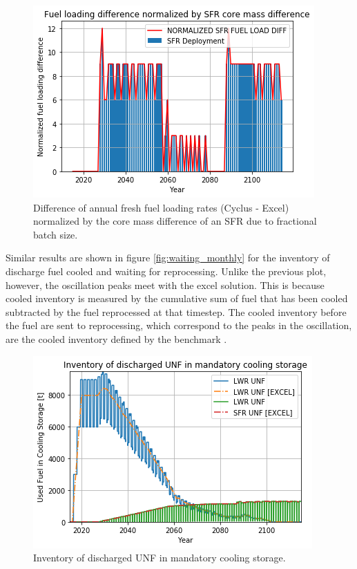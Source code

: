 \begin{figure}[htbp!]
    \begin{center}
        \includegraphics[scale=0.5]{./images/results_18/fuel_load_diff_norm.png}
    \end{center}
        \caption{Difference of annual fresh fuel loading rates (Cyclus - Excel) normalized by the core mass difference of an \gls{SFR} due to fractional batch size.}
    \label{fig:fuel_load_diff_norm}
\end{figure}


Similar results are shown in figure \ref{fig:waiting_monthly} for the inventory of discharge fuel cooled and waiting
for reprocessing.
Unlike the previous plot, however, the oscillation peaks meet with the excel
solution.  This is because cooled inventory is measured by the cumulative sum
of fuel that has been cooled subtracted by the fuel reprocessed at that timestep.
The cooled inventory before the fuel are sent to reprocessing, which correspond
to the peaks in the oscillation, are the cooled inventory defined by the benchmark \cite{feng_standardized_2016}.

\begin{figure}[htbp!]
    \begin{center}
        \includegraphics[scale=0.5]{./images/results_18/fuel_discharge_monthly.png}
    \end{center}
        \caption{Inventory of discharged \gls{UNF} in mandatory cooling storage.}
    \label{fig:fuel_discharge_monthly}
\end{figure}


